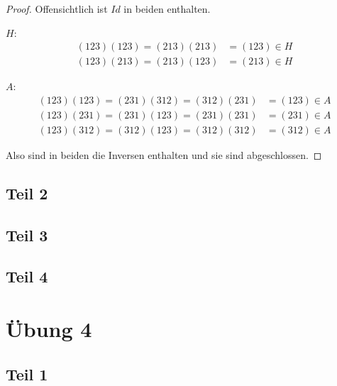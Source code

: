 \documentclass[10pt,a4paper]{article}
\begin{document}
\begin{proof}
  Offensichtlich ist $Id$ in beiden enthalten.

  $H$:
  \begin{align*}
    (123)(123) = (213)(213) & = (123) \in H\\
    (123)(213) = (213)(123) & = (213) \in H
  \end{align*}

  $A$:
  \begin{align*}
    (123)(123) = (231)(312) = (312)(231) & = (123) \in A\\
    (123)(231) = (231)(123) = (231)(231) & = (231) \in A\\
    (123)(312) = (312)(123) = (312)(312) & = (312) \in A
  \end{align*}

  Also sind in beiden die Inversen enthalten und sie sind abgeschlossen.
\end{proof}

\subsection{Teil 2}

\subsection{Teil 3}

\subsection{Teil 4}

\section{Übung 4}

\subsection{Teil 1}
\end{document}
